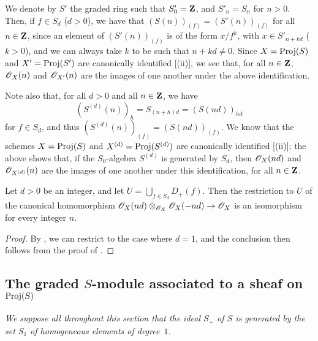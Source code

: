 \begin{env}[2.5.16]
\label{II.2.5.16}
We denote by $S'$ the graded ring such that $S'_0=\mathbf{Z}$, and $S'_n=S_n$ for $n>0$.
Then, if $f\in S_d$ ($d>0$), we have that $(S(n))_{(f)}=(S'(n))_{(f)}$ for all $n\in\mathbf{Z}$, since an element of $(S'(n))_{(f)}$ is of the form $x/f^k$, with $x\in S'_{n+kd}$ ($k>0$), and we can always take $k$ to be such that $n+kd\neq0$.
Since $X=\operatorname{Proj}(S)$ and $X'=\operatorname{Proj}(S')$ are canonically identified [(ii)], we see that, for all $n\in\mathbf{Z}$, $\mathscr{O}_X(n)$ and $\mathscr{O}_{X'}(n)$ are the images of one another under the above identification.

Note also that, for all $d>0$ and all $n\in\mathbf{Z}$, we have
\[
  (S^{(d)}(n))_h = S_{(n+h)d} = (S(nd))_{hd}
\]
for $f\in S_d$, and thus $(S^{(d)}(n))_{(f)}=(S(nd))_{(f)}$.
We know that the schemes $X=\operatorname{Proj}(S)$ and $X^{(d)}=\operatorname{Proj}(S^{(d)})$ are canonically identified [(ii)];
the above shows that, if the $S_0$-algebra $S^{(d)}$ is generated by $S_d$, then $\mathscr{O}_X(nd)$ and $\mathscr{O}_{X^{(d)}}(n)$ are the images of one another under this identification, for all $n\in\mathbf{Z}$.
\end{env}

\begin{proposition}[2.5.17]
\label{II.2.5.17}
Let $d>0$ be an integer, and let $U=\bigcup_{f\in S_d}D_+(f)$.
Then the restriction to $U$ of the canonical homomorphism $\sh{O}_X(nd)\otimes_{\sh{O}_X}\sh{O}_X(-nd)\to\sh{O}_X$ is an isomorphism for every integer $n$.
\end{proposition}

\begin{proof}
By , we can restrict to the case where $d=1$, and the conclusion then follows from the proof of .
\end{proof}


\subsection{The graded $S$-module associated to a sheaf on $\operatorname{Proj}(S)$}
\label{subsection:II.2.6}

\emph{We suppose all throughout this section that the ideal $S_+$ of $S$ is generated by the set $S_1$ of homogeneous elements of degree~$1$.}

\begin{env}[2.6.1]
\label{II.2.6.1}
\end{env}
